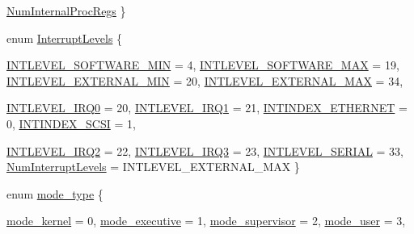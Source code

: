 \begin{DoxyCompactItemize}
\hyperlink{namespaceAlphaISA_ac76a902b2e65598399068bb755d21c61a70427ff525cb627f3e57c9041bf01dfc}{NumInternalProcRegs}
 \}
\item 
enum \hyperlink{namespaceAlphaISA_aa201d1f9b8ac67b80bdf6c08f370558c}{InterruptLevels} \{ \par
\hyperlink{namespaceAlphaISA_aa201d1f9b8ac67b80bdf6c08f370558ca88adb4d39e622bee9138a72de9b75dbf}{INTLEVEL\_\-SOFTWARE\_\-MIN} =  4, 
\hyperlink{namespaceAlphaISA_aa201d1f9b8ac67b80bdf6c08f370558ca42283470a6f9edde0640fe389f0923c0}{INTLEVEL\_\-SOFTWARE\_\-MAX} =  19, 
\hyperlink{namespaceAlphaISA_aa201d1f9b8ac67b80bdf6c08f370558ca5bafe7db9166b1b771927b598c5bdb69}{INTLEVEL\_\-EXTERNAL\_\-MIN} =  20, 
\hyperlink{namespaceAlphaISA_aa201d1f9b8ac67b80bdf6c08f370558ca7ad4f1039bf43f99bcc4646a5a7125c9}{INTLEVEL\_\-EXTERNAL\_\-MAX} =  34, 
\par
\hyperlink{namespaceAlphaISA_aa201d1f9b8ac67b80bdf6c08f370558ca1d59f88cd22bfa77731bd6901a322a28}{INTLEVEL\_\-IRQ0} =  20, 
\hyperlink{namespaceAlphaISA_aa201d1f9b8ac67b80bdf6c08f370558ca6f91d7932be0aefa29b9d6c9e73243a6}{INTLEVEL\_\-IRQ1} =  21, 
\hyperlink{namespaceAlphaISA_aa201d1f9b8ac67b80bdf6c08f370558ca3038a9544c77113b06ff7927474bca85}{INTINDEX\_\-ETHERNET} =  0, 
\hyperlink{namespaceAlphaISA_aa201d1f9b8ac67b80bdf6c08f370558caf7f545d2095c0fbb8a1c2fb3ad8ba947}{INTINDEX\_\-SCSI} =  1, 
\par
\hyperlink{namespaceAlphaISA_aa201d1f9b8ac67b80bdf6c08f370558caeffd94245750f2425c81d89d863aef9e}{INTLEVEL\_\-IRQ2} =  22, 
\hyperlink{namespaceAlphaISA_aa201d1f9b8ac67b80bdf6c08f370558ca11505da41aee172a0c93fd2783b608a6}{INTLEVEL\_\-IRQ3} =  23, 
\hyperlink{namespaceAlphaISA_aa201d1f9b8ac67b80bdf6c08f370558cac9ef7357d98cc6e509a35b6c9af80d57}{INTLEVEL\_\-SERIAL} =  33, 
\hyperlink{namespaceAlphaISA_aa201d1f9b8ac67b80bdf6c08f370558ca99ca7f61018446c5139d3d7865a5c634}{NumInterruptLevels} =  INTLEVEL\_\-EXTERNAL\_\-MAX
 \}
\item 
enum \hyperlink{namespaceAlphaISA_a19269c193c0c4866cdc4e5abd433f9fc}{mode\_\-type} \{ \par
\hyperlink{namespaceAlphaISA_a19269c193c0c4866cdc4e5abd433f9fcaf24dd055e83953a0eac0581789b006d0}{mode\_\-kernel} =  0, 
\hyperlink{namespaceAlphaISA_a19269c193c0c4866cdc4e5abd433f9fca1a153ce3964f86ad65c31804d55305f2}{mode\_\-executive} =  1, 
\hyperlink{namespaceAlphaISA_a19269c193c0c4866cdc4e5abd433f9fcaba0f60b6ad51837713241f76e66422c1}{mode\_\-supervisor} =  2, 
\hyperlink{namespaceAlphaISA_a19269c193c0c4866cdc4e5abd433f9fcac1644b8fa5c8123b58d6ca56eda84972}{mode\_\-user} =  3, 

\end{DoxyCompactItemize}
